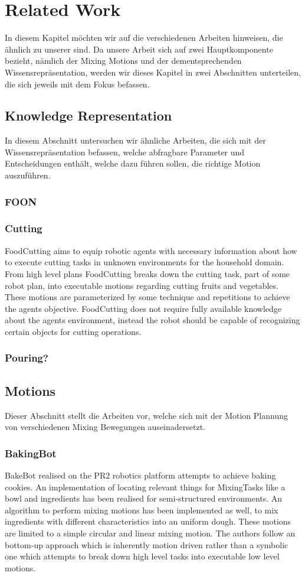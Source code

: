 \chapter*{Related Work}

In diesem Kapitel möchten wir auf die verschiedenen Arbeiten hinweisen, die ähnlich zu unserer sind.
Da unsere Arbeit sich auf zwei Hauptkomponente bezieht, nämlich der Mixing Motions und der dementsprechenden Wissensrepräsentation, werden wir dieses Kapitel in zwei Abschnitten unterteilen, die sich jeweils mit dem Fokus befassen.
\section*{Knowledge Representation}
In diesem Abschnitt untersuchen wir ähnliche Arbeiten, die sich mit der Wissensrepräsentation befassen, welche abfragbare Parameter und Entscheidungen enthält, welche dazu führen sollen, die richtige Motion auszuführen.
\subsection*{FOON}
\subsection*{Cutting}
FoodCutting aims to equip robotic agents with necessary information about how to 
execute  cutting tasks in unknown environments for the household domain. From high level plans FoodCutting breaks down 
the cutting task, part of some robot plan, into executable motions regarding cutting fruits and vegetables. These motions are parameterized 
by some technique and repetitions to achieve the agents objective. 
FoodCutting does not require fully available knowledge
about the agents environment, instead the robot should be capable of recognizing certain objects for cutting 
operations. 
\subsection*{Pouring?}
\section*{Motions}
Dieser Abschnitt stellt die Arbeiten vor, welche sich mit der Motion Plannung von verschiedenen Mixing Bewegungen auseinadersetzt.
\subsection*{BakingBot}
BakeBot realised on the PR2 robotics platform attempts to achieve baking cookies. An implementation of locating relevant things for MixingTasks
like a bowl and ingredients has been realised for semi-structured environments. An algorithm to perform mixing motions has been implemented as well, to mix 
ingredients with different characteristics into an uniform dough. These motions are limited to a simple circular and linear mixing motion.
The authors follow an bottom-up approach which is inherently motion driven rather than a
symbolic one which attempts to break down high level tasks into executable low level motions. 

